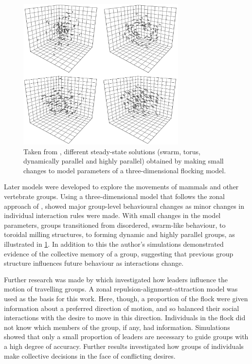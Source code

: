 \begin{figure}[tb]
  \includegraphics[width=0.75\textwidth]{couzin.png}
  \caption{Taken from \textcite{couzin02}, different steady-state
    solutions (swarm, torus, dynamically parallel and highly parallel) obtained
    by making small changes to model parameters of a three-dimensional flocking
    model.}
  \label{fig:couzin}
\end{figure}

Later models were developed to explore the movements of mammals and other
vertebrate groups. Using a three-dimensional model that follows the zonal
approach of \textcite{aoki82}, \textcite{couzin02} showed major group-level
behavioural changes as minor changes in individual interaction rules were made.
With small changes in the model parameters, groups transitioned from
disordered, swarm-like behaviour, to toroidal milling structures, to forming
dynamic and highly parallel groups, as illustrated in \cref{fig:couzin}. In
addition to this the author's simulations demonstrated evidence of the
collective memory of a group, suggesting that previous group structure
influences future behaviour as interactions change.

Further research was made by \textcite{couzin05} which investigated how leaders
influence the motion of travelling groups. A zonal
repulsion-alignment-attraction model was used as the basis for this work. Here,
though, a proportion of the flock were given information about a preferred
direction of motion, and so balanced their social interactions with the desire
to move in this direction. Individuals in the flock did not know which members
of the group, if any, had information. Simulations showed that only a small
proportion of leaders are necessary to guide groups with a high degree of
accuracy. Further results investigated how groups of individuals make
collective decisions in the face of conflicting desires.

